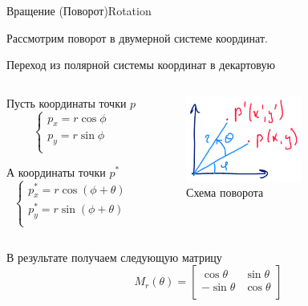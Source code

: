 \documentclass{beamer}
\begin{document}
	\begin{frame}{Вращение (Поворот)}{Rotation}
		
		Рассмотрим поворот в двумерной системе координат.

		Переход из полярной системы координат в декартовую



		\begin{columns}
			\begin{column}{0.5\textwidth}
				Пусть координаты точки $p$
				\[
					\begin{cases}
						p_x = r \cos \phi \\
						p_y = r \sin \phi \\
					\end{cases}
				\]

				А координаты точки $p^*$
				\[
					\begin{cases}
						p_x^* = r \cos (\phi + \theta) \\
						p_y^* = r \sin (\phi + \theta) \\
					\end{cases}
				\]
			\end{column}
			\begin{column}{0.5\textwidth}

				\begin{figure} 
						\includegraphics[width=0.6\textwidth]{images/rotation.png}
					\caption{Схема поворота}
				\end{figure}

			\end{column}
		\end{columns}



		В результате получаем следующую матрицу
		\[
			M_r(\theta) =
			\begin{bmatrix}
				\cos \theta & \sin \theta \\
				-\sin \theta & \cos \theta  \\
			\end{bmatrix}
		\]


\end{frame}
\end{document}
